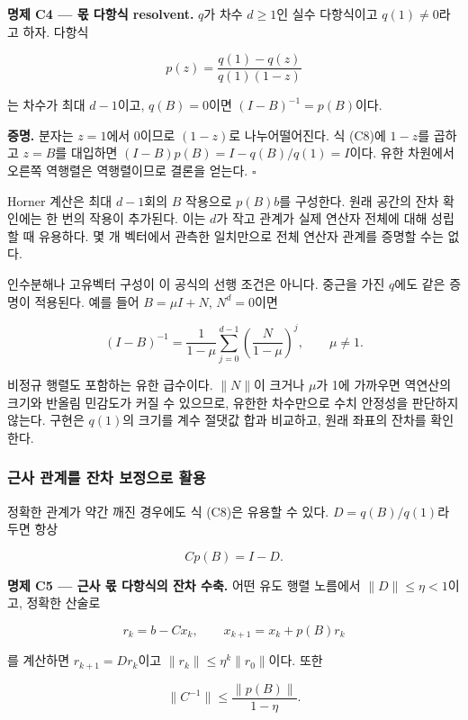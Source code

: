 \documentclass[
  10pt,
  dvipsnames]{article}
\begin{document}
\textbf{명제 C4 --- 몫 다항식 resolvent.} \(q\)가 차수 \(d\ge1\)인 실수
다항식이고 \(q(1)\ne0\)라고 하자. 다항식

\[
 p(z)=\frac{q(1)-q(z)}{q(1)(1-z)}
 \tag{C8}
\]

는 차수가 최대 \(d-1\)이고, \(q(B)=0\)이면 \((I-B)^{-1}=p(B)\)이다.

\textbf{증명.} 분자는 \(z=1\)에서 0이므로 \((1-z)\)로 나누어떨어진다. 식
(C8)에 \(1-z\)를 곱하고 \(z=B\)를 대입하면
\((I-B)p(B)=I-q(B)/q(1)=I\)이다. 유한 차원에서 오른쪽 역행렬은
역행렬이므로 결론을 얻는다. \(\square\)

Horner 계산은 최대 \(d-1\)회의 \(B\) 작용으로 \(p(B)b\)를 구성한다. 원래
공간의 잔차 확인에는 한 번의 작용이 추가된다. 이는 \(d\)가 작고 관계가
실제 연산자 전체에 대해 성립할 때 유용하다. 몇 개 벡터에서 관측한
일치만으로 전체 연산자 관계를 증명할 수는 없다.

인수분해나 고유벡터 구성이 이 공식의 선행 조건은 아니다. 중근을 가진
\(q\)에도 같은 증명이 적용된다. 예를 들어 \(B=\mu I+N\), \(N^d=0\)이면

\[
 (I-B)^{-1}=\frac1{1-\mu}\sum_{j=0}^{d-1}
                   \left(\frac{N}{1-\mu}\right)^j,\qquad\mu\ne1.
 \tag{C9}
\]

비정규 행렬도 포함하는 유한 급수이다. \(\|N\|\)이 크거나 \(\mu\)가 1에
가까우면 역연산의 크기와 반올림 민감도가 커질 수 있으므로, 유한한
차수만으로 수치 안정성을 판단하지 않는다. 구현은 \(q(1)\)의 크기를 계수
절댓값 합과 비교하고, 원래 좌표의 잔차를 확인한다.

\hypertarget{uxadfcuxc0ac-uxad00uxacc4uxb97c-uxc794uxcc28-uxbcf4uxc815uxc73cuxb85c-uxd65cuxc6a9}{%
\subsubsection{근사 관계를 잔차 보정으로
활용}\label{uxadfcuxc0ac-uxad00uxacc4uxb97c-uxc794uxcc28-uxbcf4uxc815uxc73cuxb85c-uxd65cuxc6a9}}

정확한 관계가 약간 깨진 경우에도 식 (C8)은 유용할 수 있다.
\(D=q(B)/q(1)\)라 두면 항상

\[
 Cp(B)=I-D.
 \tag{C10}
\]

\textbf{명제 C5 --- 근사 몫 다항식의 잔차 수축.} 어떤 유도 행렬 노름에서
\(\|D\|\le\eta<1\)이고, 정확한 산술로

\[
 r_k=b-Cx_k,\qquad x_{k+1}=x_k+p(B)r_k
 \tag{C11}
\]

를 계산하면 \(r_{k+1}=Dr_k\)이고 \(\|r_k\|\le\eta^k\|r_0\|\)이다. 또한

\[
 \|C^{-1}\|\le\frac{\|p(B)\|}{1-\eta}.
 \tag{C12}
\]
\end{document}
